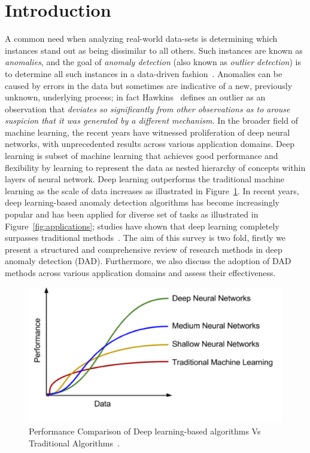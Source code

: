 
\section{Introduction}

A common need when analyzing real-world data-sets is determining which instances stand out as being dissimilar to all others. Such instances are known as \emph{anomalies}, and the goal of \emph{anomaly detection} (also known as \emph{outlier detection}) is to determine all such instances in a data-driven fashion~\cite{chandola2007outlier}. Anomalies can be caused by errors in the data but sometimes are indicative of a new, previously unknown, underlying process; in fact Hawkins~\cite{hawkins} defines an outlier as an observation that {\it deviates so significantly from other observations as to arouse suspicion that it was generated by a different mechanism.} In the broader field of machine learning, the recent years have witnessed proliferation of deep neural networks, with unprecedented results across various application domains. Deep learning is subset of machine learning that achieves good performance and flexibility by learning to represent the data as nested hierarchy of concepts within layers of neural network. Deep learning outperforms the traditional machine learning as the scale of data increases as illustrated in Figure~\ref{fig:performanceCompare}. In recent years, deep learning-based anomaly detection algorithms has become increasingly popular and has been applied for diverse set of tasks as illustrated in Figure~\ref{fig:applications}; studies have shown that deep learning completely surpasses traditional methods~\cite{javaid2016deep,peng2015multi}. The aim of this survey is two fold, firstly we present a structured and comprehensive review of research methods in deep anomaly detection (DAD). Furthermore, we also discuss the adoption of  DAD methods across various application domains and assess their effectiveness.


\begin{figure}[h]
\centering
\includegraphics[scale=0.5]{images/traditionalVsDeepLearning}
\captionsetup{justification=centering}
\caption{Performance Comparison of Deep learning-based algorithms Vs Traditional Algorithms~\cite{deeplearningVstraditionalAlgorithms}.}
\label{fig:performanceCompare}
\end{figure}


